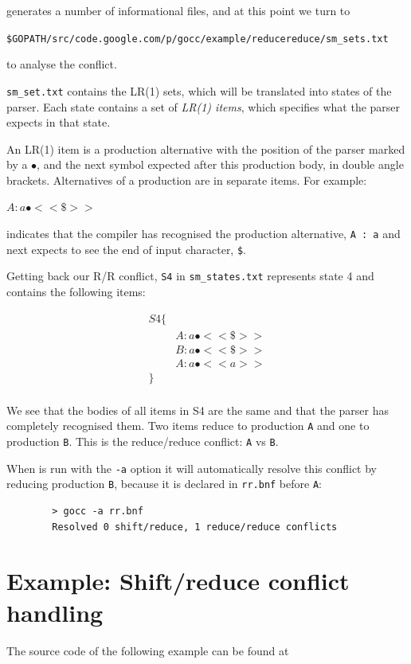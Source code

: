\documentclass[12pt]{article}
\begin{document}
	\gocc generates a number of informational files, and at this point we turn to 

	\verb|$GOPATH/src/code.google.com/p/gocc/example/reducereduce/sm_sets.txt|

	to analyse the conflict.

	\verb|sm_set.txt| contains the LR(1) sets, which will be translated into states of the parser. Each state contains a set of {\em LR(1)  items}, which specifies what the parser expects in that state. 

	An LR(1) item is a production alternative with the position of the parser marked by a $\bullet$, and the next symbol expected after this production body, in double angle brackets. Alternatives of a production are in  separate items. For example: 

	$A : a\bullet <<\$>>$

	indicates that the compiler has recognised the production alternative, \verb|A : a| and  next expects to see the end of input character, \verb|$|.

	Getting back our R/R conflict, \verb|S4|  in \verb|sm_states.txt| represents state 4 and contains the following items:

	\[
		\begin{array}{ll}
			S4 \{ \\
			    & A : a\bullet  <<\$>> \\
			    & B : a\bullet  <<\$>> \\
			    & A : a\bullet  <<a>> \\
			\} \\
		\end{array}
	\]

	We see that the bodies of all items in S4 are the same and that the parser has completely recognised them. Two items reduce to production \verb|A| and one to production \verb|B|. This is the reduce/reduce conflict: \verb|A| vs \verb|B|.

	When \gocc is run with the \verb|-a| option it will automatically resolve this conflict by reducing production \verb|B|, because it is declared in \verb|rr.bnf| before \verb|A|:

	\begin{verbatim}
		> gocc -a rr.bnf
		Resolved 0 shift/reduce, 1 reduce/reduce conflicts
	\end{verbatim}

\section{Example: Shift/reduce conflict handling} \label{sec:example sr}
	The source code of the following example can be found at
\end{document}

